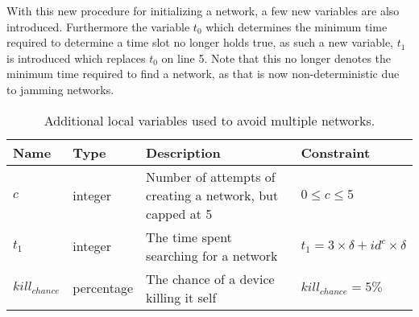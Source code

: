 \bigskip \noindent
With this new procedure for initializing a network, a few new variables are also introduced.
Furthermore the variable $t_0$ which determines the minimum time required to determine a time slot no longer holds true, as such a new variable, $t_1$ is introduced which replaces $t_0$ on  line 5.
Note that this no longer denotes the minimum time required to find a network, as that is now non-deterministic due to jamming networks.
\begin{table}[h]
    {\setlength{\extrarowheight}{1ex}%
    \begin{tabularx}{\textwidth}{l|l|X|l}
        \toprule
        Name                & Type       & Description & Constraint \\
        \midrule
        $c$                 & integer    & Number of attempts of creating a network, but capped at 5                         & $0 \leq c \leq 5$     \\
        $t_1$               & integer    & The time spent searching for a network                                            & $t_1 = 3 \times \delta + id^c \times \delta$     \\
        $kill_{chance}$     & percentage & The chance of a device killing it self                                            & $kill_{chance} = 5\%$  \\
        \bottomrule
    \end{tabularx}}
    \caption{Additional local variables used to avoid multiple networks.}
    \label{tab:locals_wmulticonnect}
\end{table}